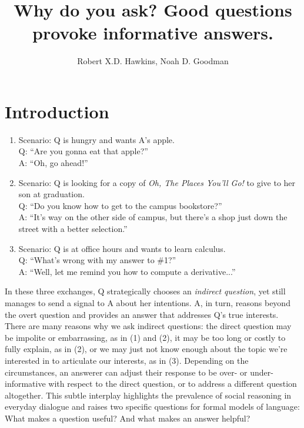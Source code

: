 \documentclass[12pt, floatsintext, jou]{apa6}
\title{Why do you ask? Good questions provoke informative answers.}
\author{Robert X.D. Hawkins, Noah D. Goodman}
\affiliation{Stanford University}
\begin{document}
\maketitle
\section{Introduction}

\begin{enumerate}[(1)]
\item Scenario: Q is hungry and wants A's apple.\\Q: ``Are you gonna eat that apple?''\\ A: ``Oh, go ahead!''
\item Scenario: Q is looking for a copy of \emph{Oh, The Places You'll Go!} to give to her son at graduation.\\ Q: ``Do you know how to get to the campus bookstore?''\\ A: ``It's way on the other side of campus, but there's a shop just down the street with a better selection.''
\item Scenario: Q is at office hours and wants to learn calculus.\\ Q: ``What's wrong with my answer to \#1?''\\ A: ``Well, let me remind you how to compute a derivative...''
\end{enumerate}

In these three exchanges, Q strategically chooses an \emph{indirect question}, yet still manages to send a signal to A about her intentions. 
A, in turn, reasons beyond the overt question and provides an answer that addresses Q's true interests. 
There are many reasons why we ask indirect questions: the direct question may be impolite or embarrassing, as in (1) and (2), it may be too long or costly to fully explain, as in (2), or we may just not know enough about the topic we're interested in to articulate our interests, as in (3). 
Depending on the circumstances, an answerer can adjust their response to be over- or under-informative with respect to the direct question, or to address a different question altogether. 
This subtle interplay highlights the prevalence of social reasoning in everyday dialogue and raises two specific questions for formal models of language: What makes a question useful? And what makes an answer helpful? 
\end{document}
